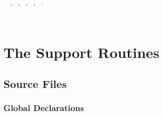 \documentclass{report}
\begin{document}
\begin{flushleft}
\begin{minipage}{\linewidth}
\begin{list}{}{\setlength{\itemsep}{-\parsep}\setlength{\itemindent}{-\leftmargin}}
\end{list}
\vspace{-2ex}
\footnotesize\addtolength{\baselineskip}{-1ex}
\begin{list}{}{\setlength{\itemsep}{-\parsep}\setlength{\itemindent}{-\leftmargin}}
\item \NWtxtIdentsUsed\nobreak\  \verb@fclose@\nobreak\ , \verb@FILE@\nobreak\ , \verb@fopen@\nobreak\ , \verb@getc@\nobreak\ , \verb@remove@\nobreak\ .\end{list}
\end{minipage}\\[4ex]
\end{flushleft}
\chapter{The Support Routines}

\section{Source Files} \label{source-files}

\subsection{Global Declarations}
\end{document}
